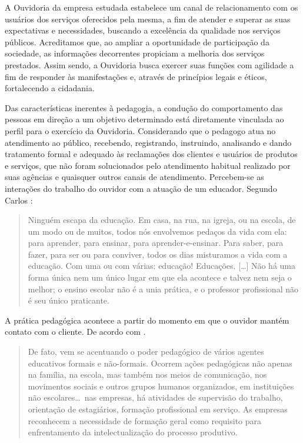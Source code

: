 \begin{refsection}
    A Ouvidoria da empresa estudada estabelece um canal de relacionamento com os usuários dos serviços oferecidos pela mesma, a fim de atender e superar as suas expectativas e necessidades, buscando a excelência da qualidade nos serviços públicos. Acreditamos que, ao ampliar a oportunidade de participação da sociedade, as informações decorrentes propiciam a melhoria dos serviços prestados. Assim sendo, a Ouvidoria busca exercer suas funções com agilidade a fim de responder às manifestações e, através de princípios legais e éticos, fortalecendo a cidadania. 

    Das características inerentes à pedagogia, a condução do comportamento das pessoas em direção a um objetivo determinado está diretamente vinculada ao perfil para o exercício da Ouvidoria. Considerando que o pedagogo atua no atendimento ao público, recebendo, registrando, instruindo, analisando e dando tratamento formal e adequado às reclamações dos clientes e usuários de produtos e serviços, que não foram solucionados pelo atendimento habitual realizado por suas agências e quaisquer outros canais de atendimento. Percebem-se as interações do trabalho do ouvidor com a atuação de um educador. Segundo Carlos \textcite[p.~1]{BRANDÃO1981que}:

    \begin{quotation}
        Ninguém escapa da educação. Em casa, na rua, na igreja, ou na escola, de um modo ou de muitos, todos nós envolvemos pedaços da vida com ela: para aprender, para ensinar, para aprender-e-ensinar. Para saber, para fazer, para ser ou para conviver, todos os dias misturamos a vida com a educação. Com uma ou com várias: educação! Educações. [\dots] Não há uma forma única nem um único lugar em que ela acontece e talvez nem seja o melhor; o ensino escolar não é a unia prática, e o professor profissional não é seu único praticante.
    \end{quotation}

 

    A prática pedagógica acontece a partir do momento em que o ouvidor mantém contato com o cliente. De acordo com \textcite[p.~27]{LIBÂNEO2005campo}. 

    \begin{quotation}
        De fato, vem se acentuando o poder pedagógico de vários agentes educativos formais e não-formais. Ocorrem ações pedagógicas não apenas na família, na escola, mas também nos meios de comunicação, nos movimentos sociais e outros grupos humanos organizados, em instituições não escolares\dots{}~nas empresas, há atividades de supervisão do trabalho, orientação de estagiários, formação profissional em serviço. As empresas reconhecem a necessidade de formação geral como requisito para enfrentamento da intelectualização do processo produtivo. 
    \end{quotation}



\end{refsection}
